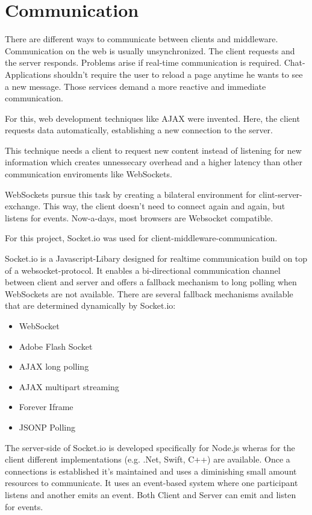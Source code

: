 \section{Communication}
There are different ways to communicate between clients and middleware. 
Communication on the web is usually unsynchronized. 
The client requests and the server responds. 
Problems arise if real-time communication is required. 
Chat-Applications shouldn't require the user to reload a page anytime he wants to see a new message.
Those services demand a more reactive and immediate communication.

For this, web development techniques like AJAX \parencite{ajax} were invented. 
Here, the client requests data automatically, establishing a new connection to the server.

This technique needs a client to request new content instead of listening 
for new information which creates unnessecary overhead and a higher latency than other communication enviroments like WebSockets.  
 
WebSockets pursue this task by creating a bilateral environment for clint-server-exchange. 
This way, the client doesn't need to connect again and again, but listens for events. 
Now-a-days, most browsers are Websocket compatible.

For this project, Socket.io was used for client-middleware-communication.

Socket.io is a Javascript-Libary designed for realtime communication build on top of a websocket-protocol.
It enables a bi-directional communication channel between client and server and offers a fallback mechanism to long polling when WebSockets are not available.
There are several fallback mechanisms available that are determined dynamically by Socket.io:
\begin{itemize}
    \item WebSocket
    \item Adobe Flash Socket
    \item AJAX long polling
    \item AJAX multipart streaming
    \item Forever Iframe
    \item JSONP Polling
\end{itemize}

The server-side of Socket.io is developed  specifically for Node.js wheras for the client different implementations (e.g. .Net, Swift, C++)\parencite{socketioClients} are available.
Once a connections is established it's maintained and uses a diminishing small amount resources to communicate. 
It uses an event-based system where one participant listens and another emits an event. 
Both Client and Server can emit and listen for events.

